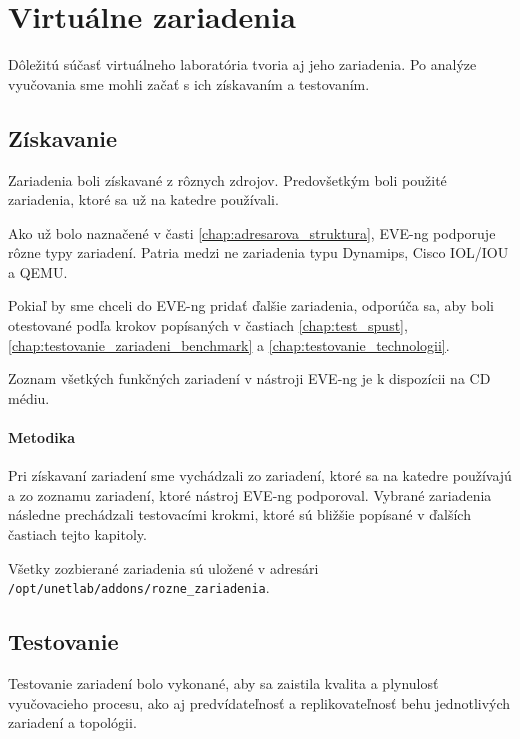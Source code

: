 \chapter{Virtuálne zariadenia}
\label{chap:virt_zariadenia}

Dôležitú súčasť virtuálneho laboratória tvoria aj jeho zariadenia. Po analýze vyučovania sme mohli začať s ich získavaním a testovaním.




\section{Získavanie}

Zariadenia boli získavané z rôznych zdrojov. Predovšetkým boli použité zariadenia, ktoré sa už na katedre používali.

Ako už bolo naznačené v časti \ref{chap:adresarova_struktura}, EVE-ng podporuje rôzne typy zariadení. Patria medzi ne zariadenia typu Dynamips, Cisco IOL/IOU a QEMU.

Pokiaľ by sme chceli do EVE-ng pridať ďalšie zariadenia, odporúča sa, aby boli otestované podľa krokov popísaných v častiach \ref{chap:test_spust}, \ref{chap:testovanie_zariadeni_benchmark} a \ref{chap:testovanie_technologii}.

Zoznam všetkých funkčných zariadení v nástroji EVE-ng je k dispozícii na CD médiu.




\subsubsection{Metodika}

Pri získavaní zariadení sme vychádzali zo zariadení, ktoré sa na katedre používajú a zo zoznamu zariadení, ktoré nástroj EVE-ng podporoval. Vybrané zariadenia následne prechádzali testovacími krokmi, ktoré sú bližšie popísané v ďalších častiach tejto kapitoly.

Všetky zozbierané zariadenia sú uložené v adresári \\ \texttt{/opt/unetlab/addons/rozne\_zariadenia}.




\section{Testovanie}
\label{chap:testovanie_zariadeni}

Testovanie zariadení bolo vykonané, aby sa zaistila kvalita a plynulosť vyučovacieho procesu, ako aj predvídateľnosť a replikovateľnosť behu jednotlivých zariadení a topológii.





